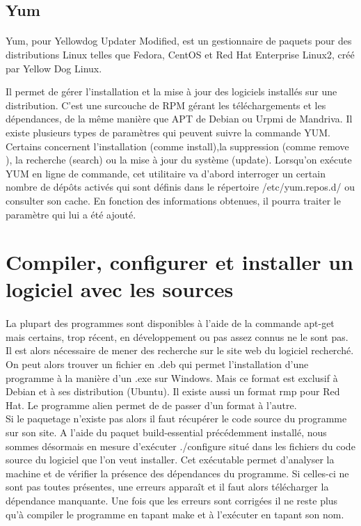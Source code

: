 \documentclass[a4paper,12pt]{article}
\begin{document}
\subsection{Yum}
\paragraph{}
Yum, pour Yellowdog Updater Modified, est un gestionnaire de paquets pour des distributions Linux telles que Fedora, CentOS et Red Hat Enterprise Linux2, créé par Yellow Dog Linux.

Il permet de gérer l'installation et la mise à jour des logiciels installés sur une distribution. C'est une surcouche de RPM gérant les téléchargements et les dépendances, de la même manière que APT de Debian ou Urpmi de Mandriva.
Il existe plusieurs types de paramètres qui peuvent suivre la commande YUM. Certains concernent l'installation (comme install),la suppression (comme remove ), la recherche (search) ou la mise à jour du système (update). Lorsqu'on exécute YUM 
en ligne de commande, cet utilitaire va d'abord interroger un certain nombre de dépôts activés qui sont définis dans le répertoire /etc/yum.repos.d/ ou consulter son cache. En fonction des informations obtenues, il pourra traiter le paramètre qui lui a été ajouté.


\section{Compiler, configurer et installer un logiciel avec les sources}
\paragraph{}

La plupart des programmes sont disponibles à l’aide de la commande apt-get mais certains, trop récent, en développement ou pas assez connus ne le sont pas. 
Il est alors nécessaire de mener des recherche sur le site web du logiciel recherché. \\
On peut alors trouver un fichier en .deb qui permet l’installation d’une programme à la manière d’un .exe sur Windows. Mais ce format est exclusif à Debian et à ses distribution (Ubuntu).
Il existe aussi un format rmp pour Red Hat. Le programme alien permet de de passer d’un format à l’autre.\\
Si le paquetage n’existe pas alors il faut récupérer le code source du programme sur son site. A l’aide du paquet build-essential précédemment installé, nous sommes désormais en mesure d’exécuter ./configure situé dans les fichiers du code source du logiciel que l’on veut installer. 
Cet exécutable permet d’analyser la machine et de vérifier la présence des dépendances du programme.
Si celles-ci ne sont pas toutes présentes, une erreurs apparaît et il faut alors télécharger la dépendance manquante. Une fois que les erreurs sont corrigées il ne reste plus qu’à compiler le programme en tapant make et à l’exécuter en tapant son nom.
\end{document}
